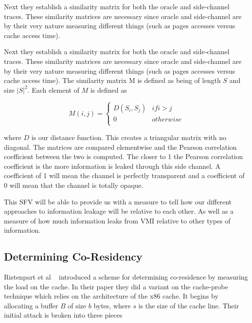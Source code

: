 Next they establish a similarity matrix for both the oracle and side-channel traces. These similarity matrices are necessary since oracle and side-channel are by their very nature measuring different things (such as pages accesses versus cache access time).  

Next they establish a similarity matrix for both the oracle and side-channel traces. These similarity matrices are necessary since oracle and side-channel are by their very nature measuring different things (such as pages accesses versus cache access time).  The similarity matrix M is defined as being of length $S$ and size $|S|^2$.  Each element of $M$ is defined as 




\begin{equation}\label{eqn:simMatrix}
M(i,j) =  
		\begin{cases}
			D(S_i, S_j) & if i > j \\
			0 & otherwise \\
		  \end{cases}
\end{equation}

where $D$ is our distance function.  This creates a triangular matrix with no diagonal. The matrices are compared elementwise and the Pearson correlation coefficient between the two is computed. The closer to 1 the Pearson correlation coefficient is the more information is leaked through this side channel. A coefficient of 1 will mean the channel is perfectly transparent and a coefficient of 0 will mean that the channel is totally opaque. 

This SFV will be able to provide us with a measure to tell how our different approaches to information leakage will be relative to each other. As well as a measure of how much information leaks from VMI relative to other types of information.

\subsection{Determining Co-Residency}

Ristenpart et al ~\cite{ristenpart_hey_2009} introduced a scheme for determining co-residence by measuring the load on the cache. In their paper they did a variant on the cache-probe technique which relies on the architecture of the x86 cache. It begins by allocating a buffer $B$ of size $b$ bytes, where $s$ is the size of the cache line.  Their initial attack is broken into three pieces

